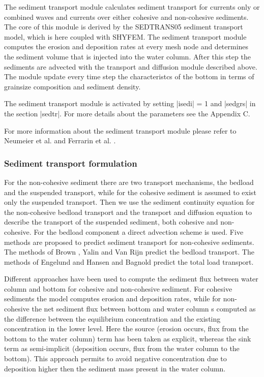 The sediment transport module calculates sediment transport for currents 
only or combined waves and currents over either cohesive and non-cohesive
sediments. The core of this module is derived by the SEDTRANS05 
sediment transport model, which is here coupled with SHYFEM. The sediment 
transport module computes the erosion and deposition rates at every mesh 
node and determines the sediment volume that is injected into the water 
column. After this step the sediments are advected with the transport and 
diffusion module described above. The module update every time step the 
characteristcs of the bottom in terms of grainsize composition and 
sediment density.

The sediment transport module is activated by setting |isedi| = 1 
and |sedgrs| in the section |sedtr|. 
For more details about the parameters see the Appendix C.

For more information about the sediment transport module please refer 
to Neumeier et al. \cite{urs:sedtrans05} and Ferrarin et al. 
\cite{ferrarin:morpho08}.

\subsubsection{Sediment transport formulation}
For the non-cohesive sediment there are two transport mechanisms, the 
bedload and the suspended transport, while for the cohesive sediment 
is assumed to exist only the suspended transport. Then we use the 
sediment continuity equation for the non-cohesive bedload transport 
and the transport and diffusion equation to describe the transport
of the suspended sediment, both cohesive and non-cohesive.
For the bedload component a direct advection scheme is used. 
Five methods are proposed to predict sediment transport for non-cohesive
sediments. The methods of Brown \cite{brown:engi}, Yalin \cite{yalin:bedload} 
and Van Rijn \cite{vanrijn93:prin} predict the bedload transport. The 
methods of Engelund and Hansen \cite{eh:momo} and Bagnold 
\cite{bagnolds:ma-sed} predict the total load transport.

Different approaches have been used to compute the sediment flux 
between water column and bottom for cohesive and non-cohesive sediment.
For cohesive sediments the model computes erosion and deposition rates,
while for non-cohesive the net sediment flux between bottom and water 
column s computed as the difference between the equilibrium
concentration and the existing concentration in the lower level.
Here the source (erosion occurs, flux from the bottom to the water 
column) term has been taken as explicit, whereas the sink term as 
semi-implicit (deposition occurs, flux from the water column to 
the bottom). This approach permits to avoid negative concentration 
due to deposition higher then the sediment mass present in the water 
column.


